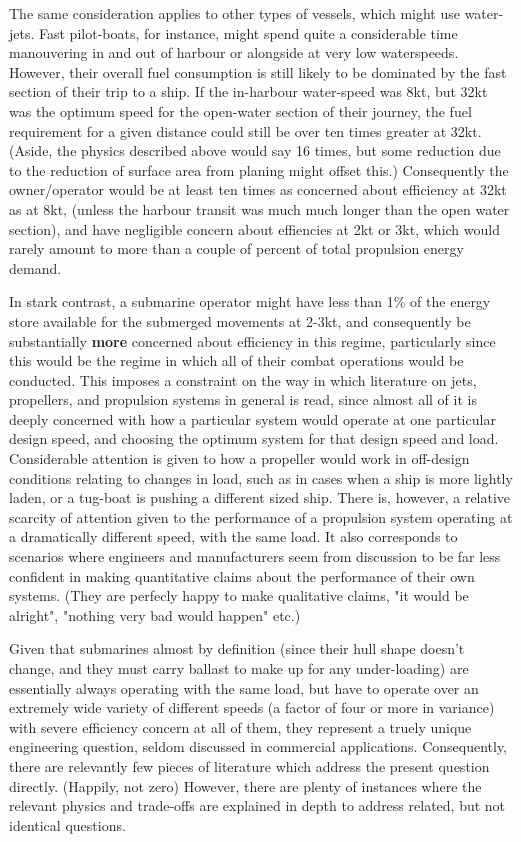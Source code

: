 \documentclass{article}\usepackage[]{graphicx}\usepackage[]{color}
\begin{document}
The same consideration applies to other types of vessels, which might use water-jets.  Fast pilot-boats, for instance, might spend quite a considerable time manouvering in and out of harbour or alongside at very low waterspeeds. However, their overall fuel consumption is still likely to be dominated by the fast section of their trip to a ship.  If the in-harbour water-speed was 8kt, but 32kt was the optimum speed for the open-water section of their journey, the fuel requirement for a given distance could still be over ten times greater at 32kt. (Aside, the physics described above would say 16 times, but some reduction due to the reduction of surface area from planing might offset this.)  Consequently the owner/operator would be at least ten times as concerned about efficiency at 32kt as at 8kt, (unless the harbour transit was much much longer than the open water section), and have negligible concern about effiencies at 2kt or 3kt, which would rarely amount to more than a couple of percent of total propulsion energy demand.

In stark contrast, a submarine operator might have less than 1\% of the energy store available for the submerged movements at 2-3kt, and consequently be substantially \textbf{more} concerned about efficiency in this regime, particularly since this would be the regime in which all of their combat operations would be conducted.
%
This imposes a constraint on the way in which literature on jets, propellers, and propulsion systems in general is read, since almost all of it is deeply concerned with how a particular system would operate at one particular design speed, and choosing the optimum system for that design speed and load.  Considerable attention is given to how a propeller would work in off-design conditions relating to changes in load, such as in cases when a ship is more lightly laden, or a tug-boat is pushing a different sized ship.  There is, however, a relative scarcity of attention given to the performance of a propulsion system operating at a dramatically different speed, with the same load. It also corresponds to scenarios where engineers and manufacturers seem from discussion to be far less confident in making quantitative claims about the performance of their own systems.  (They are perfecly happy to make qualitative claims, "it would be alright", "nothing very bad would happen" etc.)

Given that submarines almost by definition (since their hull shape doesn't change, and they must carry ballast to make up for any under-loading) are essentially always operating with the same load, but have to operate over an extremely wide variety of different speeds (a factor of four or more in variance) with severe efficiency concern at all of them, they represent a truely unique engineering question, seldom discussed in commercial applications.  Consequently, there are relevantly few pieces of literature which address the present question directly. (Happily, not zero)  However, there are plenty of instances where the relevant physics and trade-offs are explained in depth to address related, but not identical questions.
\end{document}

